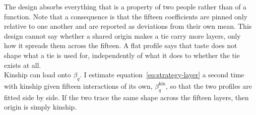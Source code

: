 \noindent The design absorbs everything that is a property of two people rather than of a function. Note that a consequence is that the fifteen coefficients are pinned only relative to one another and are reported as deviations from their own mean. This design cannot say whether a shared origin makes a tie carry more layers, only how it spreads them across the fifteen. A flat profile says that taste does not shape what a tie is used for, independently of what it does to whether the tie exists at all. \\

\noindent Kinship can load onto $\beta_q$. I estimate equation~\eqref{eq:strategy-layer} a second time with kinship given fifteen interactions of its own, $\beta^{\text{kin}}_q$, so that the two profiles are fitted side by side. If the two trace the same shape across the fifteen layers, then origin is simply kinship.\\